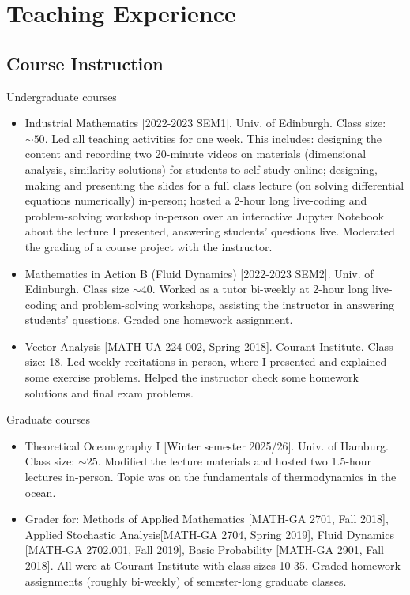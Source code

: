 \documentclass[a4paper,12pt]{article}
\begin{document}
\section{Teaching Experience}
\subsection{Course Instruction}
Undergraduate courses
\begin{itemize}[leftmargin=*,noitemsep]
\item Industrial Mathematics [2022-2023 SEM1]. Univ. of Edinburgh. Class size: $\sim 50$. Led all teaching activities for one week. This includes: designing the content and recording two 20-minute videos on materials (dimensional analysis, similarity solutions) for students to self-study online; designing, making and presenting the slides for a full class lecture (on solving differential equations numerically) in-person; hosted a 2-hour long live-coding and problem-solving workshop in-person over an interactive Jupyter Notebook about the lecture I presented, answering students’ questions live. Moderated the grading of a course project with the instructor. 
\item Mathematics in Action B (Fluid Dynamics) [2022-2023 SEM2]. Univ. of Edinburgh. Class size  $\sim 40$. Worked as a tutor bi-weekly at 2-hour long live-coding and problem-solving workshops, assisting the instructor in answering  students’ questions. Graded one homework assignment. 
\item Vector Analysis [MATH-UA 224 002, Spring 2018]. Courant Institute. Class size: 18. Led weekly recitations in-person, where I presented and explained some exercise problems. Helped the instructor check some homework solutions and final exam problems. 
\end{itemize}
Graduate courses
\begin{itemize}[leftmargin=*,noitemsep]
\item Theoretical Oceanography I [Winter semester 2025/26]. Univ. of Hamburg. Class size: $\sim 25$. Modified the lecture materials and hosted two 1.5-hour lectures in-person. Topic was on the fundamentals of thermodynamics in the ocean. 
\item Grader for: Methods of Applied Mathematics [MATH-GA 2701, Fall 2018], Applied Stochastic Analysis[MATH-GA 2704, Spring 2019], Fluid Dynamics [MATH-GA 2702.001, Fall 2019], Basic Probability [MATH-GA 2901, Fall 2018]. All were at Courant Institute with class sizes 10-35. Graded homework assignments (roughly bi-weekly) of semester-long graduate classes. %
\end{itemize}
\end{document}

